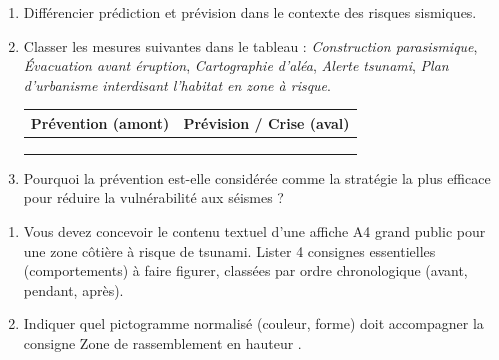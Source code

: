 \documentclass[11pt]{article}
\begin{document}
\begin{exercice}
\begin{enumerate}
    \item Différencier \og prédiction \fg{} et \og prévision \fg{} dans le contexte des risques sismiques.
    \item Classer les mesures suivantes dans le tableau : \textit{Construction parasismique}, \textit{Évacuation avant éruption}, \textit{Cartographie d'aléa}, \textit{Alerte tsunami}, \textit{Plan d'urbanisme interdisant l'habitat en zone à risque}.
    \begin{tabular}{|l|l|}
    \hline
    \textbf{Prévention (amont)} & \textbf{Prévision / Crise (aval)} \\
    \hline
    & \\
    \hline
    & \\
    \hline
    & \\
    \hline
    \end{tabular}
    \item Pourquoi la prévention est-elle considérée comme la stratégie la plus efficace pour réduire la vulnérabilité aux séismes ?
\end{enumerate}
\end{exercice}

\begin{exercice}
\begin{enumerate}
    \item Vous devez concevoir le contenu textuel d'une affiche A4 grand public pour une zone côtière à risque de tsunami. Lister 4 consignes essentielles (comportements) à faire figurer, classées par ordre chronologique (avant, pendant, après).
    \item Indiquer quel pictogramme normalisé (couleur, forme) doit accompagner la consigne \og Zone de rassemblement en hauteur \fg{}.
\end{enumerate}
\end{exercice}
\end{document}
